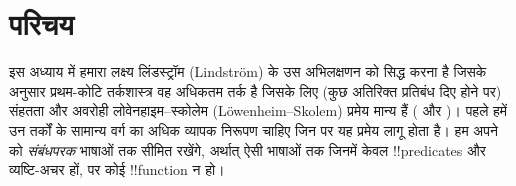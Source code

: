 \documentclass[../../../include/open-logic-section]{subfiles}
\begin{document}
\section{परिचय}

इस अध्याय में हमारा लक्ष्य लिंडस्ट्रॉम (Lindstr\"om) के उस अभिलक्षणन को
सिद्ध करना है जिसके अनुसार प्रथम-कोटि तर्कशास्त्र वह अधिकतम तर्क है जिसके
लिए (कुछ अतिरिक्त प्रतिबंध दिए होने
पर) संहतता और अवरोही लोवेनहाइम--स्कोलेम (L\"owenheim--Skolem) प्रमेय मान्य हैं
( और
)। पहले हमें उन तर्कों के सामान्य
वर्ग का अधिक व्यापक निरूपण चाहिए जिन पर यह प्रमेय लागू होता है। हम अपने को
\emph{संबंधपरक} भाषाओं तक सीमित रखेंगे, अर्थात् ऐसी भाषाओं तक जिनमें केवल
!!{predicate}s और व्यष्टि-अचर हों, पर कोई !!{function} न हो।
\end{document}
